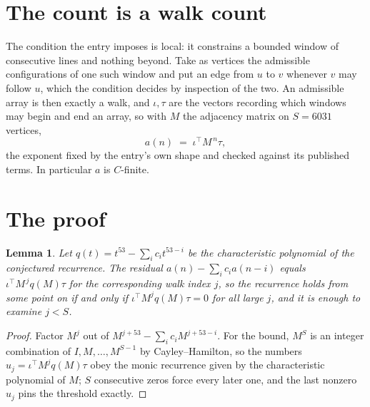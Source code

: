 \documentclass[11pt,a4paper]{article}
\theoremstyle{plain}
\newtheorem{lemma}[theorem]{Lemma}
\theoremstyle{definition}
\begin{document}
\section{The count is a walk count}

The condition the entry imposes is local: it constrains a bounded window of consecutive lines and nothing beyond. Take as vertices the admissible configurations of one such window and put an edge from $u$ to $v$ whenever $v$ may follow $u$, which the condition decides by inspection of the two.
An admissible array is then exactly a walk, and $\iota,\tau$ are the vectors recording which windows may begin and end an array, so with $M$ the adjacency matrix on $S=6031$ vertices,
\[
a(n)\;=\;\iota^{\!\top}M^{\,n}\tau ,
\]
the exponent fixed by the entry's own shape and checked against its published terms. In
particular $a$ is $C$-finite.

\section{The proof}

\begin{lemma}\label{lem:crit}
Let $q(t)=t^{53}-\sum_i c_it^{53-i}$ be the characteristic polynomial of the
conjectured recurrence. The residual $a(n)-\sum_ic_ia(n-i)$ equals
$\iota^{\!\top}M^{\,j}q(M)\tau$ for the corresponding walk index $j$, so the recurrence
holds from some point on if and only if $\iota^{\!\top}M^{j}q(M)\tau=0$ for all large $j$,
and it is enough to examine $j<S$.
\end{lemma}

\begin{proof}
Factor $M^{j}$ out of $M^{j+53}-\sum_ic_iM^{j+53-i}$. For the bound, $M^{S}$
is an integer combination of $I,M,\dots,M^{S-1}$ by Cayley--Hamilton, so the numbers
$u_j=\iota^{\!\top}M^{j}q(M)\tau$ obey the monic recurrence given by the characteristic
polynomial of $M$; $S$ consecutive zeros force every later one, and the last nonzero $u_j$
pins the threshold exactly.
\end{proof}
\end{document}
